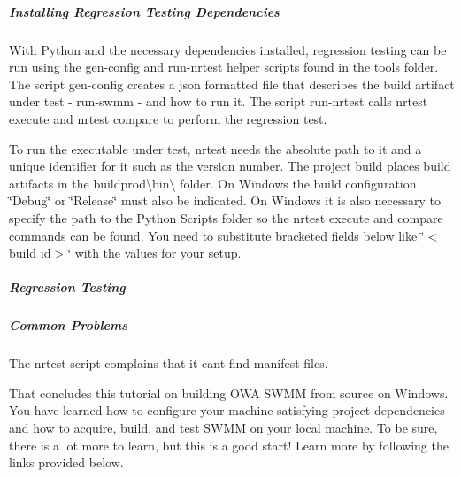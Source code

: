 \subparagraph*{Installing Regression Testing Dependencies}


\begin{DoxyCode}{0}
\end{DoxyCode}


With Python and the necessary dependencies installed, regression testing can be run using the gen-\/config and run-\/nrtest helper scripts found in the tools folder. The script gen-\/config creates a json formatted file that describes the build artifact under test -\/ run-\/swmm -\/ and how to run it. The script run-\/nrtest calls nrtest execute and nrtest compare to perform the regression test.

To run the executable under test, nrtest needs the absolute path to it and a unique identifier for it such as the version number. The project build places build artifacts in the {\ttfamily buildprod\textbackslash{}bin\textbackslash{}} folder. On Windows the build configuration \char`\"{}\+Debug\char`\"{} or \char`\"{}\+Release\char`\"{} must also be indicated. On Windows it is also necessary to specify the path to the Python Scripts folder so the nrtest execute and compare commands can be found. You need to substitute bracketed fields below like \char`\"{}$<$build id$>$\char`\"{} with the values for your setup.

\subparagraph*{Regression Testing}


\begin{DoxyCode}{0}
\end{DoxyCode}


\subparagraph*{Common Problems}

The nrtest script complains that it can\textquotesingle{}t find manifest files.

That concludes this tutorial on building O\+WA S\+W\+MM from source on Windows. You have learned how to configure your machine satisfying project dependencies and how to acquire, build, and test S\+W\+MM on your local machine. To be sure, there is a lot more to learn, but this is a good start! Learn more by following the links provided below.

